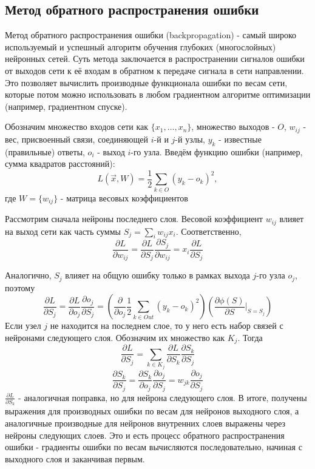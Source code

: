 	\subsection{Метод обратного распространения ошибки}
		Метод обратного распространения ошибки (backpropagation) - самый широко используемый и успешный алгоритм обучения глубоких (многослойных) нейронных сетей. Суть метода заключается в распространении сигналов ошибки от выходов сети к её входам в обратном к передаче сигнала в сети направлении. Это позволяет вычислить производные функционала ошибки по весам сети, которые потом можно использовать в любом градиентном алгоритме оптимизации (например, градиентном спуске).
		
		Обозначим множество входов сети как $\{x_1, \ldots, x_n\}$, множество выходов - $O$, $w_{ij}$ - вес, присвоенный связи, соединяющей $i$-й и $j$-й узлы, $y_k$ - известные (правильные) ответы, $o_i$ - выход $i$-го узла. Введём функцию ошибки (например, сумма квадратов расстояний):
		$$ L(\vec{x}, W) = \frac{1}{2} \sum_{k \in O} (y_k - o_k)^2, $$
		где $W = \{w_{ij}\}$ - матрица весовых коэффициентов
		
		Рассмотрим сначала нейроны последнего слоя. Весовой коэффициент $w_{ij}$ влияет на выход сети как часть суммы $S_j = \sum_i w_{ij} x_i$. Соответственно,
		$$ \frac{\partial L}{\partial w_{ij}} = \frac{\partial L}{\partial S_j} \frac{\partial S_j}{\partial w_{ij}} = x_i \frac{\partial L}{\partial S_j} $$
		
		Аналогично, $S_j$ влияет на общую ошибку только в рамках выхода $j$-го узла $o_j$, поэтому
		$$ \frac{\partial L}{\partial S_j} = \frac{\partial L}{\partial o_j} \frac{\partial o_j}{\partial S_j}  = \left(\frac{\partial}{\partial o_j} \frac{1}{2} \sum_{k \in Out} (y_k - o_k)^2 \right) \left(\frac{\partial \phi(S)}{\partial S} \bigg|_{S = S_j} \right)$$
		Если узел $j$ не находится на последнем слое, то у него есть набор связей с нейронами следующего слоя. Обозначим их множество как $K_j$. Тогда
		$$ \frac{\partial L}{\partial S_j} = \sum_{k \in K_j} \frac{\partial L}{\partial S_k} \frac{\partial S_k}{\partial S_j} $$
		$$ \frac{\partial S_k}{\partial S_j} = \frac{\partial S_k}{\partial o_j} \frac{\partial o_j}{\partial S_j} = w_{jk}\frac{\partial o_j}{\partial S_j} $$
		$ \frac{\partial L}{\partial S_k}$ - аналогичная поправка, но для нейрона следующего слоя. В итоге, получены выражения для производных ошибки по весам для нейронов выходного слоя, а аналогичные производные для нейронов внутренних слоев выражены через нейроны следующих слоев. Это и есть процесс обратного распространения ошибки - градиенты ошибки по весам вычисляются последовательно, начиная с выходного слоя и заканчивая первым.
